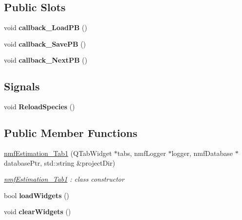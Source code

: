 \subsection*{Public Slots}
\begin{DoxyCompactItemize}
\item 
void {\bfseries callback\+\_\+\+Load\+PB} ()\hypertarget{classnmf_estimation___tab1_a111a517b2d9892c2762a13b512d9f3f7}{}\label{classnmf_estimation___tab1_a111a517b2d9892c2762a13b512d9f3f7}

\item 
void {\bfseries callback\+\_\+\+Save\+PB} ()\hypertarget{classnmf_estimation___tab1_a9741486fd83c5ed7000ef9887e5ef947}{}\label{classnmf_estimation___tab1_a9741486fd83c5ed7000ef9887e5ef947}

\item 
void {\bfseries callback\+\_\+\+Next\+PB} ()\hypertarget{classnmf_estimation___tab1_a2228ff0a3b9ec7b484b37a515baab971}{}\label{classnmf_estimation___tab1_a2228ff0a3b9ec7b484b37a515baab971}

\end{DoxyCompactItemize}
\subsection*{Signals}
\begin{DoxyCompactItemize}
\item 
void {\bfseries Reload\+Species} ()\hypertarget{classnmf_estimation___tab1_adbc14781521eb3f593b62e5f010d6517}{}\label{classnmf_estimation___tab1_adbc14781521eb3f593b62e5f010d6517}

\end{DoxyCompactItemize}
\subsection*{Public Member Functions}
\begin{DoxyCompactItemize}
\item 
\hyperlink{classnmf_estimation___tab1_ac5bfc5f07973b3cff7f34a1c2fe443fd}{nmf\+Estimation\+\_\+\+Tab1} (Q\+Tab\+Widget $\ast$tabs, nmf\+Logger $\ast$logger, nmf\+Database $\ast$database\+Ptr, std\+::string \&project\+Dir)
\begin{DoxyCompactList}\small\item\em \hyperlink{classnmf_estimation___tab1}{nmf\+Estimation\+\_\+\+Tab1} \+: class constructor \end{DoxyCompactList}\item 
bool {\bfseries load\+Widgets} ()\hypertarget{classnmf_estimation___tab1_a90da30669095e091b7057696bc1b72b4}{}\label{classnmf_estimation___tab1_a90da30669095e091b7057696bc1b72b4}

\item 
void {\bfseries clear\+Widgets} ()\hypertarget{classnmf_estimation___tab1_a0e41a91dbc55562ba02fb9eef37a35e6}{}\label{classnmf_estimation___tab1_a0e41a91dbc55562ba02fb9eef37a35e6}

\end{DoxyCompactItemize}


